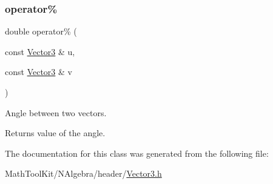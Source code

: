 \subsubsection{\texorpdfstring{operator\%}{operator\%}}
{\footnotesize\ttfamily double operator\% (\begin{DoxyParamCaption}\item[{const \mbox{\hyperlink{class_vector3}{Vector3}} \&}]{u,  }\item[{const \mbox{\hyperlink{class_vector3}{Vector3}} \&}]{v }\end{DoxyParamCaption})\hspace{0.3cm}{\ttfamily [friend]}}



Angle between two vectors. 

\begin{DoxyReturn}{Returns}
value of the angle. 
\end{DoxyReturn}


The documentation for this class was generated from the following file\+:\begin{DoxyCompactItemize}
\item 
Math\+Tool\+Kit/\+N\+Algebra/header/\mbox{\hyperlink{_vector3_8h}{Vector3.\+h}}\end{DoxyCompactItemize}
